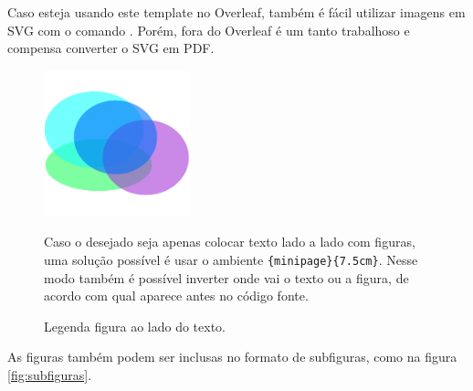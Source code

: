     Caso esteja usando este template no Overleaf, também é fácil utilizar imagens em SVG com o comando \lstinline[language=TeX, style=Code]||.
    Porém, fora do Overleaf é um tanto trabalhoso e compensa converter o SVG em PDF.

    \begin{figure}[htb]
        \centering
        \begin{minipage}{7.5cm}
            \centering
            \includegraphics[width=120pt]{images/figure.pdf}
            \caption{Legenda figura ao lado do texto.}
            \label{fig:texto_do_lado}
        \end{minipage}
        \hfill
        \begin{minipage}{7.5cm}
            \linespread{1.5}\selectfont
            
            Caso o desejado seja apenas colocar texto lado a lado com figuras, uma solução possível é usar o ambiente \lstinline[language=TeX,style=code]|{minipage}{7.5cm}|.
            Nesse modo também é possível inverter onde vai o texto ou a figura, de acordo com qual aparece antes no código fonte.

        \end{minipage}
    \end{figure}

    As figuras também podem ser inclusas no formato de subfiguras, como na figura \ref{fig:subfiguras}.

